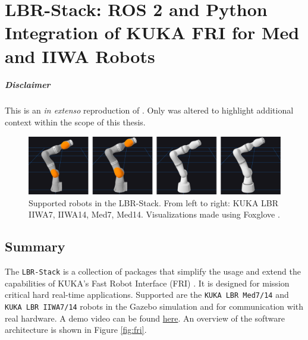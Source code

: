 \chapter{LBR-Stack: ROS 2 and Python Integration of KUKA FRI for Med and
IIWA Robots}
\label{app:lbr_stack}
\minitoc

\paragraph{Disclaimer} This  is an \textit{in extenso} reproduction of \cite{huber2023lbr}. Only  was altered to highlight additional context within the scope of this thesis.

\newpage

\begin{figure}
\centering
\includegraphics[width=\textwidth]{appendix_1/img/joss_figure.png}
\caption[Supported robots in the LBR-Stack. From left to right: KUKA LBR
IIWA7, IIWA14, Med7, Med14. Visualizations made using Foxglove
.]{Supported robots in the LBR-Stack. From left to right: KUKA LBR
IIWA7, IIWA14, Med7, Med14. Visualizations made using Foxglove
\footnotemark{}.}
\end{figure}

\hypertarget{summary}{%
\section{Summary}\label{summary}}
The \texttt{LBR-Stack} is a collection of packages that simplify the
usage and extend the capabilities of KUKA's Fast Robot Interface (FRI)
\cite{ref-fri}. It is designed
for mission critical hard real-time applications. Supported are the
\texttt{KUKA\ LBR\ Med7/14} and \texttt{KUKA\ LBR\ IIWA7/14} robots in
the Gazebo simulation \cite{ref-gazebo} and for communication with real hardware. A demo video can be
found
\href{https://www.linkedin.com/posts/mhubii_robotics-opensource-ros2-activity-7009974676017848320-S3U5/?utm_source=share\&utm_medium=member_desktop}{here}.
An overview of the software architecture is shown in Figure
\ref{fig:fri}.

